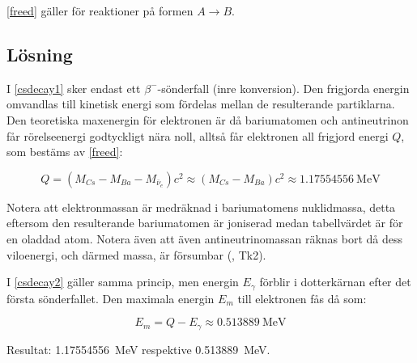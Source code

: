 \eqref{freed} gäller för reaktioner på formen $A \longrightarrow B$.

\subsection{Lösning}

I \eqref{csdecay1} sker endast ett $\beta^-$-sönderfall (inre konversion). Den
frigjorda energin omvandlas till kinetisk energi som fördelas mellan de
resulterande partiklarna. Den teoretiska maxenergin för elektronen är då
bariumatomen och antineutrinon får rörelseenergi godtyckligt nära noll, alltså
får elektronen all frigjord energi $Q$, som bestäms av \eqref{freed}:

\begin{equation}
    Q = (M_{Cs} - M_{Ba} - M_{\bar{\nu}_e})c^2 \approx (M_{Cs} - M_{Ba})c^2 \approx \qty{1.17554556}{\MeV}
\end{equation}

Notera att elektronmassan är medräknad i bariumatomens nuklidmassa, detta
eftersom den resulterande bariumatomen är joniserad medan tabellvärdet är
för en oladdad atom. Notera även att även antineutrinomassan räknas bort då
dess viloenergi, och därmed massa, är försumbar (\cite{fysika}, Tk2).

I \eqref{csdecay2} gäller samma princip, men energin $E_\gamma$ förblir i
dotterkärnan efter det första sönderfallet. Den maximala energin $E_m$ till
elektronen fås då som:

\begin{equation}
    E_m = Q - E_\gamma \approx \qty{0.513889}{\MeV}
\end{equation}

Resultat: \qty{1.17554556}{\MeV} respektive \qty{0.513889}{\MeV}.
